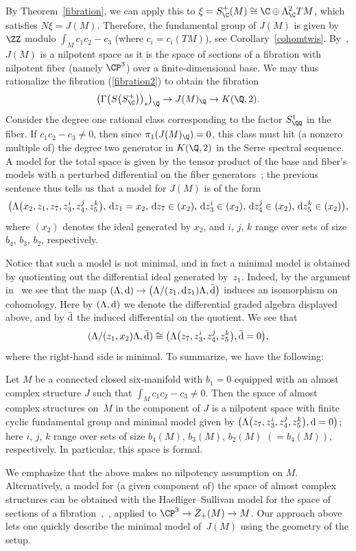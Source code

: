 By Theorem~\ref{fibration}, we can apply this to $\xi = S_{\C}^+(M) \cong \C \oplus \Lambda_{\C}^2 TM$, which satisfies ${N \xi = J(M)}$. Therefore, the fundamental group of $J(M)$ is given by $\ZZ$ modulo $\int_M\! c_1c_2-c_3$ (where ${c_i \! =\! c_i(TM)}$), see Corollary~\ref{cohomtwis}. By~\cite{M87}, $J(M)$ is a nilpotent space as it is the space of sections of a fibration with nilpotent fiber \big(namely $\CP^3$\big) over a finite-dimensional base. We may thus rationalize the fibration (\ref{fibration2}) to obtain the fibration \[\big(\Gamma\big(S\big(S_{\C}^+\big)\big)_s\big)_{\Q} \to J(M)_{\Q} \to K(\Q, 2).\] Consider the degree one rational class corresponding to the factor $S^1_{\QQ}$ in the fiber. If $c_1c_2 - c_3 \neq 0$, then since $\pi_1(J(M)_\Q) = 0$, this class must hit (a nonzero multiple of) the degree two generator in $K(\Q,2)$ in the Serre spectral sequence. A model for the total space is given by the tensor product of the base and fiber's models with a perturbed differential on the fiber generators~\cite[Section~4]{S77}; the previous sentence thus tells us that a model for $J(M)$ is of the form
\[\big(\Lambda\big(x_2, z_1, z_7, z_3^{i}, z_4^{j}, z_5^{k}\big),\, {\rm d}z_1 = x_2, \, {\rm d}z_7 \in (x_2), \, {\rm d}z_3^i \in (x_2), \, {\rm d}z_4^j \in (x_2),\, {\rm d}z_5^k \in (x_2)\big),
\] where $(x_2)$ denotes the ideal generated by $x_2$, and $i$, $j$, $k$ range over sets of size $b_4$, $b_3$, $b_2$, respectively.

Notice that such a model is not minimal, and in fact a minimal model is obtained by quotienting out the differential ideal generated by~$z_1$. Indeed, by the argument in~\cite[Proposition~2]{VS76} we see that the map $(\Lambda, {\rm d}) \to \big(\Lambda/(z_1, {\rm d}z_1)\Lambda, \bar{{\rm d}}\big)$ induces an isomorphism on cohomology.
Here by $(\Lambda,{\rm d})$ we denote the differential graded algebra displayed above, and by $\bar{{\rm d}}$ the induced differential on the quotient. We see that
\[
(\Lambda/(z_1, x_2)\Lambda, \bar{{\rm d}}) \cong \big(\Lambda\big(z_7, z_3^{i}, z_4^{j}, z_5^{k}\big), \bar{{\rm d}}=0\big),
\] where the right-hand side is minimal. To summarize, we have the following:

\begin{Theorem}\label{Qhomotopy6} Let $M$ be a connected closed six-manifold with $b_1 = 0$ equipped with an almost complex structure $J$ such that $\int_M c_1c_2-c_3 \neq 0$. Then the space of almost complex structures on~$M$ in the component of $J$ is a nilpotent space with finite cyclic fundamental group and minimal model given by $\big(\Lambda\big(z_7, z_3^{i}, z_4^{j}, z_5^{k}\big), {\rm d} = 0\big)$; here $i$, $j$, $k$ range over sets of size $b_4(M)$, $b_3(M)$, $b_2(M)$ $(=b_4(M))$, respectively. In particular, this space is formal.
\end{Theorem}

We emphasize that the above makes no nilpotency assumption on $M$. Alternatively, a model for (a given component of) the space of almost complex structures can be obtained with the Haefliger--Sullivan model for the space of sections of a fibration~\cite[Section~11]{S77},~\cite{H82}, applied to $\CP^3 \to Z_+(M) \to M$. Our approach above lets one quickly describe the minimal model of~$J(M)$ using the geometry of the setup.
